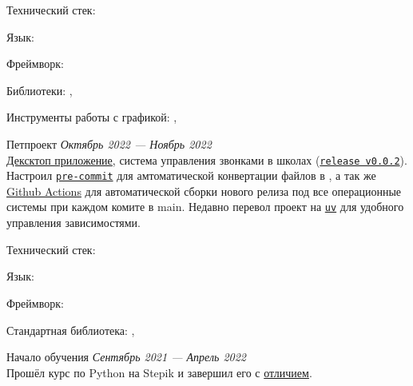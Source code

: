 \documentclass[margin,line]{resume}
\begin{document}
\begin{resume}
\begin{description}
      Технический стек:
      \begin{list2}
      \item{Язык: }
      \item{Фреймворк: }
      \item{Библиотеки: , }
      \item{Инструменты работы с графикой: ,
        }
      \end{list2}

      \vspace{3mm}

    \item[SchoolRing]\small{Петпроект\hfill
      \textsl{Октябрь 2022 — Ноябрь 2022\vspace{2mm}}}\\
      \href{https://github.com/alchemmist/school-ring}{Дексктоп
      приложение}, система управления звонками в школах
      (\href{https://github.com/}{\texttt{release
      v0.0.2}}). Настроил
      \href{https://github.com}{\texttt{pre-commit}} для
      амтоматической конвертации  файлов в
      , а так же \href{https://github.com}{Github
      Actions} для автоматической сборки нового релиза под все
      операционные системы при каждом комите в main. Недавно перевол
      проект на \href{https://astral.sh/blog/uv}{\texttt{uv}} для
      удобного управления зависимостями.

      Технический стек:
      \begin{list2}
      \item{Язык: }
      \item{Фреймворк: }
      \item{Стандартная библиотека: ,
        }
      \end{list2}

      \vspace{3mm}

    \item[Курс Python]\small{Начало обучения
      \hfill \textsl{Сентябрь 2021 — Апрель 2022\vspace{2mm}}}\\
      Прошёл курс по Python на Stepik и завершил его с
      \href{https://github.com/alchemmist/CV/blob/main/attachments/stepik-python-course.pdf}{отличием}.

  \end{description}
\end{resume}
\end{document}

